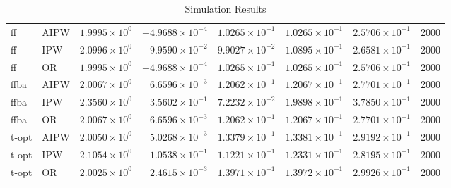 \begin{table}[ht]
\begin{tabular}{llrrrrrr}
   \midrule
ff & AIPW & $1.9995 \times 10^{0}$ & $-4.9688 \times 10^{-4}$ & $1.0265 \times 10^{-1}$ & $1.0265 \times 10^{-1}$ & $2.5706 \times 10^{-1}$ & 2000 \\ 
  ff & IPW & $2.0996 \times 10^{0}$ & $9.9590 \times 10^{-2}$ & $9.9027 \times 10^{-2}$ & $1.0895 \times 10^{-1}$ & $2.6581 \times 10^{-1}$ & 2000 \\ 
  ff & OR & $1.9995 \times 10^{0}$ & $-4.9688 \times 10^{-4}$ & $1.0265 \times 10^{-1}$ & $1.0265 \times 10^{-1}$ & $2.5706 \times 10^{-1}$ & 2000 \\ 
   \midrule
ffba & AIPW & $2.0067 \times 10^{0}$ & $6.6596 \times 10^{-3}$ & $1.2062 \times 10^{-1}$ & $1.2067 \times 10^{-1}$ & $2.7701 \times 10^{-1}$ & 2000 \\ 
  ffba & IPW & $2.3560 \times 10^{0}$ & $3.5602 \times 10^{-1}$ & $7.2232 \times 10^{-2}$ & $1.9898 \times 10^{-1}$ & $3.7850 \times 10^{-1}$ & 2000 \\ 
  ffba & OR & $2.0067 \times 10^{0}$ & $6.6596 \times 10^{-3}$ & $1.2062 \times 10^{-1}$ & $1.2067 \times 10^{-1}$ & $2.7701 \times 10^{-1}$ & 2000 \\ 
   \midrule
t-opt & AIPW & $2.0050 \times 10^{0}$ & $5.0268 \times 10^{-3}$ & $1.3379 \times 10^{-1}$ & $1.3381 \times 10^{-1}$ & $2.9192 \times 10^{-1}$ & 2000 \\ 
  t-opt & IPW & $2.1054 \times 10^{0}$ & $1.0538 \times 10^{-1}$ & $1.1221 \times 10^{-1}$ & $1.2331 \times 10^{-1}$ & $2.8195 \times 10^{-1}$ & 2000 \\ 
  t-opt & OR & $2.0025 \times 10^{0}$ & $2.4615 \times 10^{-3}$ & $1.3971 \times 10^{-1}$ & $1.3972 \times 10^{-1}$ & $2.9926 \times 10^{-1}$ & 2000 \\ 
   \bottomrule
\end{tabular}
\caption{Simulation Results} 
\label{tab:results}
\end{table}

